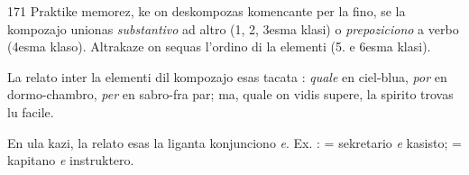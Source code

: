 \begin{VUpage}[175]{171}
Praktike memorez, ke on deskompozas komencante per la\nl
fino, se la kompozajo unionas \textit{substantivo} ad altro (1, 2,\nl
3esma klasi) o \textit{prepoziciono} a verbo (4esma klaso). Altrakaze\nl
on sequas l'ordino di la elementi (5. e 6esma klasi).

La relato inter la elementi dil kompozajo esas tacata :\nl
\textit{quale} en ciel-blua, \textit{por} en dormo-chambro, \textit{per} en sabro-fra\cc
par; ma, quale on vidis supere, la spirito trovas lu facile.\parplein

En ula kazi, la relato esas la liganta konjunciono \textit{e}. Ex. :\nl
{} = sekretario \textit{e} kasisto; \cc
{} = kapitano \textit{e} instruktero.
\end{VUpage}

